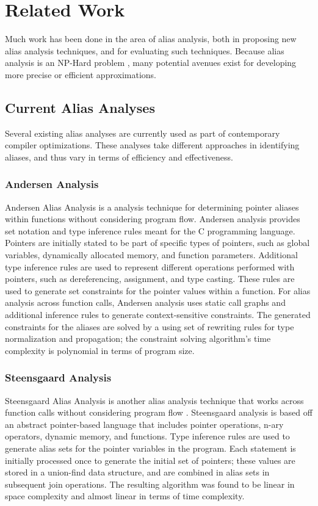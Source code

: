 \chapter{Related Work}

Much work has been done in the area of alias analysis, both in proposing new alias analysis techniques, and for evaluating such techniques. Because alias analysis is an NP-Hard problem \cite{Hardekopf}, many potential avenues exist for developing more precise or efficient approximations.

\section{Current Alias Analyses}
Several existing alias analyses are currently used as part of contemporary compiler optimizations. These analyses take different approaches in identifying aliases, and thus vary in terms of efficiency and effectiveness.

\subsection{Andersen Analysis}
Andersen Alias Analysis is a analysis technique for determining pointer aliases within functions without considering program flow. Andersen analysis provides set notation and type inference rules meant for the C programming language. Pointers are initially stated to be part of specific types of pointers, such as global variables, dynamically allocated memory, and function parameters. Additional type inference rules are used to represent different operations performed with pointers, such as dereferencing, assignment, and type casting. These rules are used to generate set constraints for the pointer values within a function. For alias analysis across function calls, Andersen analysis uses static call graphs and additional inference rules to generate context-sensitive constraints. The generated constraints for the aliases are solved by a using set of rewriting rules for type normalization and propagation; the constraint solving algorithm's time complexity is polynomial in terms of program size.

\subsection{Steensgaard Analysis}
Steensgaard Alias Analysis is another alias analysis technique that works across function calls without considering program flow \cite{Steensgaard}. Steensgaard analysis is based off an abstract pointer-based language that includes pointer operations, n-ary operators, dynamic memory, and functions. Type inference rules are used to generate alias sets for the pointer variables in the program. Each statement is initially processed once to generate the initial set of pointers; these values are stored in a union-find data structure, and are combined in alias sets in subsequent join operations. The resulting algorithm was found to be linear in space complexity and almost linear in terms of time complexity.

